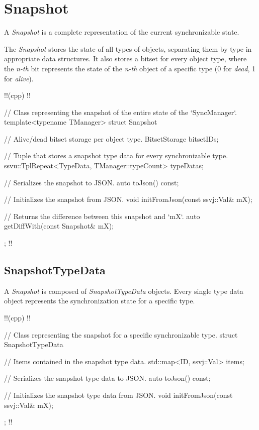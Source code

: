 \documentclass{report}
\begin{document}
        \section{Snapshot}

            A \emph{Snapshot} is a complete representation of the current synchronizable state.

            The \emph{Snapshot} stores the state of all types of objects, separating them by type in appropriate data structures.
            It also stores a bitset for every object type, where the \emph{n-th} bit represents the state of the \emph{n-th} object of a specific type (0 for \emph{dead}, 1 for \emph{alive}).

!!(cpp)
!!{
    // Class representing the snapshot of the entire state of the `SyncManager`.
    template<typename TManager> struct Snapshot
    {
        // Alive/dead bitset storage per object type.
        BitsetStorage bitsetIDs;

        // Tuple that stores a snapshot type data for every synchronizable type.
        ssvu::TplRepeat<TypeData, TManager::typeCount> typeDatas;

        // Serializes the snapshot to JSON.
        auto toJson() const;

        // Initializes the snapshot from JSON.
        void initFromJson(const ssvj::Val& mX);

        // Returns the difference between this snapshot and `mX`.
        auto getDiffWith(const Snapshot& mX);
    };
!!}

            \subsection{SnapshotTypeData}

                A \emph{Snapshot} is composed of \emph{SnapshotTypeData} objects. 
                Every single type data object represents the synchronization state for a specific type.

!!(cpp)
!!{
    // Class representing the snapshot for a specific synchronizable type.
    struct SnapshotTypeData
    {
        // Items contained in the snapshot type data.
        std::map<ID, ssvj::Val> items;

        // Serializes the snapshot type data to JSON.
        auto toJson() const;

        // Initializes the snapshot type data from JSON.
        void initFromJson(const ssvj::Val& mX);
    };
!!}
    
\end{document}
